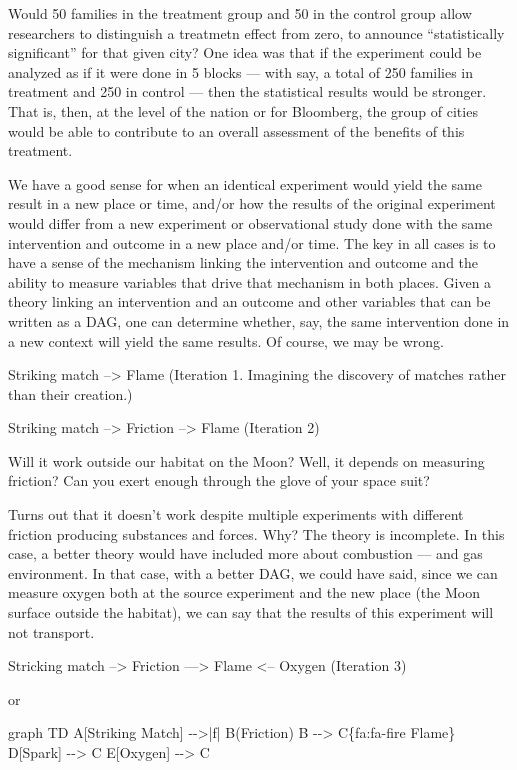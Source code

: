 \documentclass[
]{article}
\newenvironment{Shaded}{}{}
\newcommand{\NormalTok}[1]{#1}
\begin{document}
Would 50 families in the treatment group and 50 in the control group
allow researchers to distinguish a treatmetn effect from zero, to
announce ``statistically significant'' for that given city? One idea was
that if the experiment could be analyzed as if it were done in 5 blocks
--- with say, a total of 250 families in treatment and 250 in control
--- then the statistical results would be stronger. That is, then, at
the level of the nation or for Bloomberg, the group of cities would be
able to contribute to an overall assessment of the benefits of this
treatment.

We have a good sense for when an identical experiment would yield the
same result in a new place or time, and/or how the results of the
original experiment would differ from a new experiment or observational
study done with the same intervention and outcome in a new place and/or
time. The key in all cases is to have a sense of the mechanism linking
the intervention and outcome and the ability to measure variables that
drive that mechanism in both places. Given a theory linking an
intervention and an outcome and other variables that can be written as a
DAG, one can determine whether, say, the same intervention done in a new
context will yield the same results. Of course, we may be wrong.

Striking match --\textgreater{} Flame (Iteration 1. Imagining the
discovery of matches rather than their creation.)

Striking match --\textgreater{} Friction --\textgreater{} Flame
(Iteration 2)

Will it work outside our habitat on the Moon? Well, it depends on
measuring friction? Can you exert enough through the glove of your space
suit?

Turns out that it doesn't work despite multiple experiments with
different friction producing substances and forces. Why? The theory is
incomplete. In this case, a better theory would have included more about
combustion --- and gas environment. In that case, with a better DAG, we
could have said, since we can measure oxygen both at the source
experiment and the new place (the Moon surface outside the habitat), we
can say that the results of this experiment will not transport.

Stricking match --\textgreater{} Friction ---\textgreater{} Flame
\textless-- Oxygen (Iteration 3)

or

\begin{Shaded}
\begin{Highlighting}[]
\NormalTok{graph TD}
\NormalTok{    A[Striking Match] {-}{-}\textgreater{}|f| B(Friction)}
\NormalTok{    B {-}{-}\textgreater{} C\{fa:fa{-}fire Flame\}}
\NormalTok{    D[Spark] {-}{-}\textgreater{} C}
\NormalTok{    E[Oxygen] {-}{-}\textgreater{} C}
\end{Highlighting}
\end{Shaded}
\end{document}
